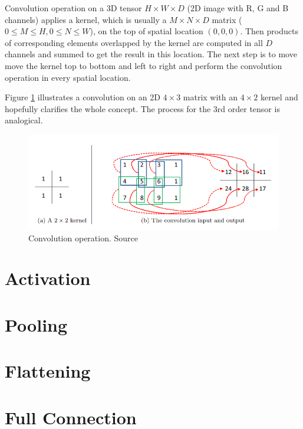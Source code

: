 Convolution operation on a 3D tensor $H \times W \times D$ (2D image with R, G and B channels) applies a kernel, which is usually a $M \times N \times D$ matrix 
($0 \leq M \leq H, 0 \leq N \leq W$), on the top of spatial location $(0, 0, 0)$. Then products of corresponding elements overlapped by the kernel are computed in all $D$ channels and summed to get the result in this location. The next step is to move move the kernel top to bottom and left to right and perform the convolution operation in every spatial location.

Figure \ref{fig:conv-example} illustrates a convolution on an 2D $4 \times 3$ matrix with an $4 \times 2$ kernel and hopefully clarifies the whole concept. The process for the 3rd order tensor is analogical.

\begin{figure}
    \centering
    \includegraphics[width=14cm]{img/ConvExample.png}
    \caption{Convolution operation. Source \cite{Wu2017IntroductionTC}}
    \label{fig:conv-example}
\end{figure}


\section{Activation}
\label{sec:conv-activation}

\section{Pooling}
\label{sec:conv-pooling}

\section{Flattening}
\label{sec:flattening}

\section{Full Connection}
\label{sec:full-conn}